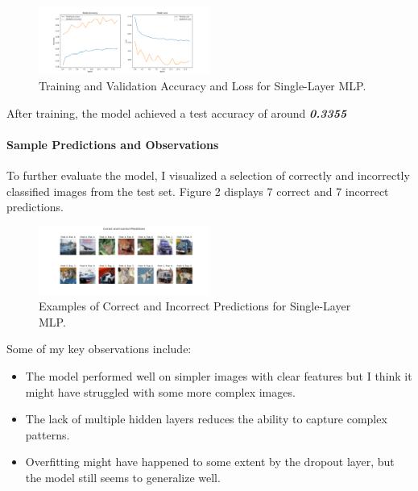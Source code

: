 \documentclass[lettersize,journal]{IEEEtran}
\begin{document}
\begin{figure}[h!]
    \centering
    \includegraphics[width=0.5\textwidth]{training_history_MLP_onelayer.png}
    \caption{Training and Validation Accuracy and Loss for Single-Layer MLP.}
    \label{fig:onelayer_history}
\end{figure}

After training, the model achieved a test accuracy of around \textbf{\textit{0.3355}}

\paragraph{\textbf{Sample Predictions and Observations}}

To further evaluate the model, I visualized a selection of correctly and incorrectly classified images from the test set. Figure 2 displays 7 correct and 7 incorrect predictions. 

\begin{figure}[h!]
    \centering
    \includegraphics[width=0.5\textwidth]{sample_predictions_onelayer.png}
    \caption{Examples of Correct and Incorrect Predictions for Single-Layer MLP.}
    \label{fig:onelayer_predictions}
\end{figure}

Some of my key observations include:
\begin{itemize}
    \item The model performed well on simpler images with clear features but I think it might have struggled with some more complex images.
    \item The lack of multiple hidden layers reduces the ability to capture complex patterns.
    \item Overfitting might have happened to some extent by the dropout layer, but the model still seems to generalize well.
\end{itemize}
\end{document}
